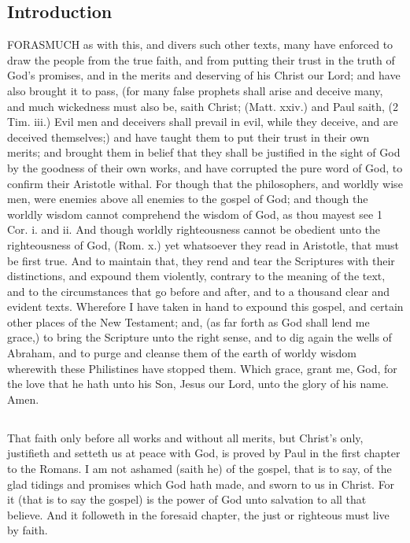 \subsection*{Introduction}
FORASMUCH as with this, and divers such other 
texts, many have enforced to draw the people from the 
true faith, and from putting their trust in the truth of 
God's promises, and in the merits and deserving of his 
Christ our Lord; and have also brought it to pass, (for 
many false prophets shall arise and deceive many, and 
much wickedness must also be, saith Christ; (Matt. xxiv.) 
and Paul saith, (2 Tim. iii.) Evil men and deceivers 
shall prevail in evil, while they deceive, and are deceived 
themselves;) and have taught them to put their trust in 
their own merits; and brought them in belief that they 
shall be justified in the sight of God by the goodness of 
their own works, and have corrupted the pure word of 
God, to confirm their Aristotle withal. For though that 
the philosophers, and worldly wise men, were enemies 
above all enemies to the gospel of God; and though the 
worldly wisdom cannot comprehend the wisdom of God, 
as thou mayest see 1 Cor. i. and ii. And though worldly 
righteousness cannot be obedient unto the righteousness of 
God, (Rom. x.) yet whatsoever they read in Aristotle, 
that must be first true. And to maintain that, they rend 
and tear the Scriptures with their distinctions, and
expound them violently, contrary to the meaning of the text, 
and to the circumstances that go before and after, and to 
a thousand clear and evident texts. Wherefore I have 
taken in hand to expound this gospel, and certain other 
places of the New Testament; and, (as far forth as God 
shall lend me grace,) to bring the Scripture unto the 
right sense, and to dig again the wells of Abraham, and 
to purge and cleanse them of the earth of worldy wisdom 
wherewith these Philistines have stopped them. Which 
grace, grant me, God, for the love that he hath unto 
his Son, Jesus our Lord, unto the glory of his name. 
Amen. 

\subsection*{}
That faith only before all works and without all merits, 
but Christ's only, justifieth and setteth us at peace with 
God, is proved by Paul in the first chapter to the Romans. 
I am not ashamed (saith he) of the gospel, that is to say, 
of the glad tidings and promises which God hath made, 
and sworn to us in Christ. For it (that is to say the gospel) 
is the power of God unto salvation to all that believe. 
And it followeth in the foresaid chapter, the just or
righteous must live by faith.

